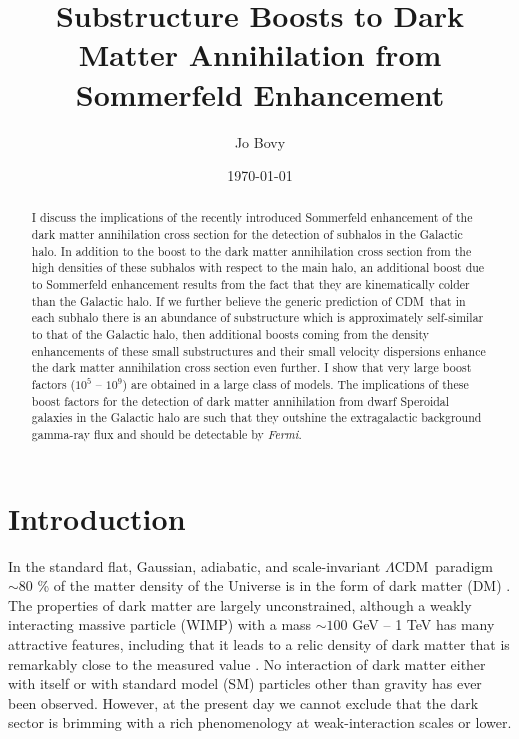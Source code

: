 \documentclass[aps,prd,twocolumn,amsmath,amssymb,floatfix,nofootinbib,10pt]{revtex4}
\newcommand{\Fermi}{\emph{Fermi}}
\newcommand{\CDM}{CDM}
\newcommand{\LCDM}{\ensuremath{\Lambda}\CDM}
\newcommand{\DM}{DM}
\newcommand{\SM}{SM}
\begin{document}
\title{Substructure Boosts to Dark Matter Annihilation from Sommerfeld Enhancement}
\author{Jo Bovy} 

\date{\today}

\begin{abstract}
I discuss the implications of the recently introduced Sommerfeld
enhancement of the dark matter annihilation cross section for the
detection of subhalos in the Galactic halo.  In addition to the boost
to the dark matter annihilation cross section from the high densities
of these subhalos with respect to the main halo, an additional boost
due to Sommerfeld enhancement results from the fact that they are
kinematically colder than the Galactic halo. If we further believe the
generic prediction of \CDM\ that in each subhalo there is an abundance
of substructure which is approximately self-similar to that of the
Galactic halo, then additional boosts coming from the density
enhancements of these small substructures and their small velocity
dispersions enhance the dark matter annihilation cross section even
further. I show that very large boost factors ($10^5$ -- $10^9$) are
obtained in a large class of models. The implications of these boost
factors for the detection of dark matter annihilation from dwarf
Speroidal galaxies in the Galactic halo are such that they outshine
the extragalactic background gamma-ray flux and should be detectable
by \Fermi.
\end{abstract}

\maketitle

\section{Introduction}
In the standard flat, Gaussian, adiabatic, and scale-invariant \LCDM\
paradigm $\sim\!80$ \% of the matter density of the Universe is in the
form of dark matter (\DM) \cite{2008arXiv0803.0547K}. The properties
of dark matter are largely unconstrained, although a weakly
interacting massive particle (WIMP) with a mass $\sim\!100$ GeV -- 1
TeV has many attractive features, including that it leads to a relic
density of dark matter that is remarkably close to the measured value
\cite{1996PhR...267..195J}. No interaction of dark matter either with
itself or with standard model (\SM) particles other than gravity has
ever been observed. However, at the present day we cannot exclude that
the dark sector is brimming with a rich phenomenology at
weak-interaction scales or lower.
\end{document}
